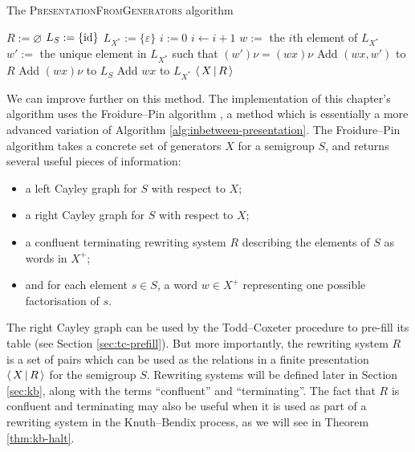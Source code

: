 \begin{algorithm}
\caption{The \textsc{PresentationFromGenerators} algorithm}
\label{alg:inbetween-presentation}
  \begin{algorithmic}[1]
      \State $R := \varnothing$
      \State $L_S := \{\operatorname{id}\}$
      \State $L_{X^*} := \{\varepsilon\}$
      \State $i := 0$  
      \Repeat
      \State $i \gets i + 1$
      \State $w :=$ the $i$th element of $L_{X^*}$
            
          \State $w' :=$ the unique element in $L_{X^*}$ such that $(w')\nu = (wx)\nu$
            \State Add $(wx, w')$ to $R$
          \Else  {}
            \State Add $(wx)\nu$ to $L_S$
            \State Add $wx$ to $L_{X^*}$
          \EndIf
        \EndFor
        
      \State \Return $\left\langle \, X \, \middle| \, R \, \right\rangle$
    \EndProcedure
  \end{algorithmic}
\end{algorithm}

We can improve further on this method.  The \libsemigroups{}
implementation of this chapter's algorithm uses the Froidure--Pin algorithm
\cite{froidure_pin}, a method which is essentially a more advanced variation of
Algorithm \ref{alg:inbetween-presentation}.  The Froidure--Pin algorithm takes a concrete set of
generators $X$ for a semigroup $S$, and returns several useful pieces
of information:
\begin{itemize}
\item a left Cayley graph for $S$ with respect to $X$;
\item a right Cayley graph for $S$ with respect to $X$;
\item a confluent terminating rewriting system $R$ describing the elements of
  $S$ as words in $X^+$;
\item and for each element $s \in S$, a word $w \in X^+$ representing one
  possible factorisation of $s$.
\end{itemize}
The right Cayley graph can be used by the Todd--Coxeter procedure to pre-fill its
table (see Section \ref{sec:tc-prefill}).  But more importantly, the rewriting
system $R$ is a set of pairs which can be used as the relations in a finite
presentation $\left\langle \, X \, \middle| \, R \, \right\rangle$ for the semigroup $S$.
Rewriting systems will be defined later in Section \ref{sec:kb}, along with the
terms ``confluent'' and ``terminating''.  The fact that $R$ is confluent
and terminating may also be useful when it is used as part of a rewriting system
in the Knuth--Bendix process, as we will see in Theorem \ref{thm:kb-halt}.

